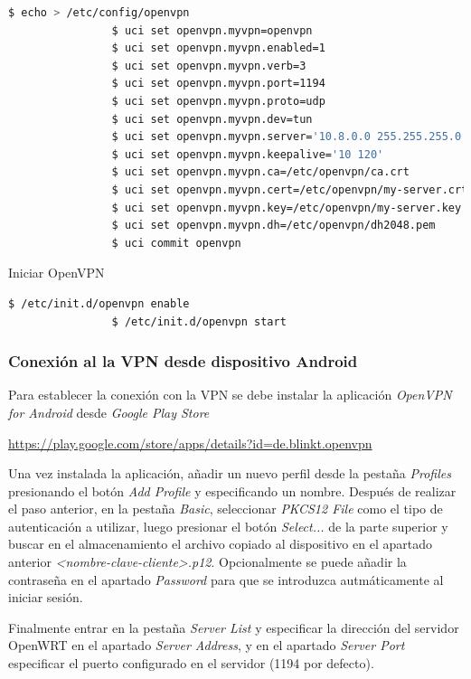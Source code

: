 \documentclass{article}
\begin{document}
            \begin{lstlisting}[language=bash]
                $ echo > /etc/config/openvpn
                $ uci set openvpn.myvpn=openvpn
                $ uci set openvpn.myvpn.enabled=1
                $ uci set openvpn.myvpn.verb=3
                $ uci set openvpn.myvpn.port=1194
                $ uci set openvpn.myvpn.proto=udp
                $ uci set openvpn.myvpn.dev=tun
                $ uci set openvpn.myvpn.server='10.8.0.0 255.255.255.0'
                $ uci set openvpn.myvpn.keepalive='10 120'
                $ uci set openvpn.myvpn.ca=/etc/openvpn/ca.crt
                $ uci set openvpn.myvpn.cert=/etc/openvpn/my-server.crt
                $ uci set openvpn.myvpn.key=/etc/openvpn/my-server.key
                $ uci set openvpn.myvpn.dh=/etc/openvpn/dh2048.pem
                $ uci commit openvpn
            \end{lstlisting}

            Iniciar OpenVPN
            \begin{lstlisting}[language=bash]
                $ /etc/init.d/openvpn enable
                $ /etc/init.d/openvpn start
            \end{lstlisting}

        \subsubsection{Conexión al la VPN desde dispositivo Android}
            Para establecer la conexión con la VPN se debe instalar la aplicación \textit{OpenVPN for Android} desde \textit{Google Play Store}
            
            \url{https://play.google.com/store/apps/details?id=de.blinkt.openvpn}

            Una vez instalada la aplicación, añadir un nuevo perfil desde la pestaña \textit{Profiles} presionando el botón \textit{Add Profile} y especificando un nombre. Después de realizar el paso anterior, en la pestaña \textit{Basic}, seleccionar \textit{PKCS12 File} como el tipo de autenticación a utilizar, luego presionar el botón \textit{Select...} de la parte superior y buscar en el almacenamiento el archivo copiado al dispositivo en el apartado anterior \textit{<nombre-clave-cliente>.p12}. Opcionalmente se puede añadir la contraseña en el apartado \textit{Password} para que se introduzca autmáticamente al iniciar sesión.

            Finalmente entrar en la pestaña \textit{Server List} y especificar la dirección del servidor OpenWRT en el apartado \textit{Server Address}, y en el apartado \textit{Server Port} especificar el puerto configurado en el servidor (1194 por defecto).
\end{document}

